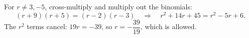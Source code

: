 For $r\ne3,-5$, cross-multiply and multiply out the binomials:
\[
(r+9)(r+5)=(r-2)(r-3)\quad\Longrightarrow\quad r^2+14r+45=r^2-5r+6 .
\]
The $r^2$ terms cancel: $19r=-39$, so $r=\boxed{-\dfrac{39}{19}}$, which is allowed.
